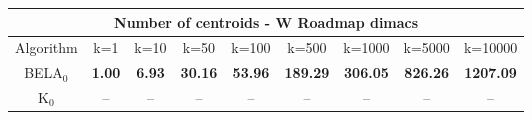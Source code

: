 \begin{tabular}{c|cccccccc}\toprule
\multicolumn{9}{c}{Number of centroids - W Roadmap dimacs}\\ \midrule
Algorithm & k=1 & k=10 & k=50 & k=100 & k=500 & k=1000 & k=5000 & k=10000 \\ \midrule
BELA$_0$ & \textbf{1.00} & \textbf{6.93} & \textbf{30.16} & \textbf{53.96} & \textbf{189.29} & \textbf{306.05} & \textbf{826.26} & \textbf{1207.09} \\
K$_0$ & -- & -- & -- & -- & -- & -- & -- & -- \\ \bottomrule 
\end{tabular}
